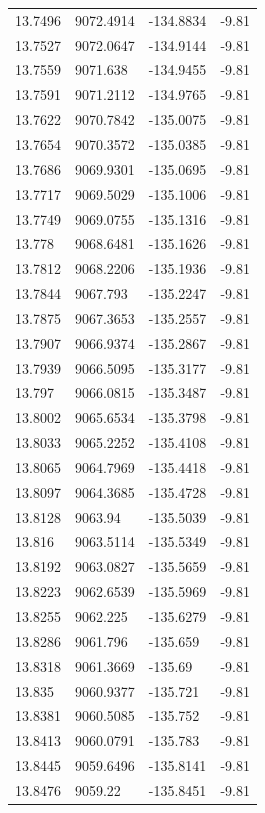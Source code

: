 \begin{table}[H]
\begin{tabular}{llll}
13.7496 & 9072.4914 & -134.8834 & -9.81 \\
13.7527 & 9072.0647 & -134.9144 & -9.81 \\
13.7559 & 9071.638 & -134.9455 & -9.81 \\
13.7591 & 9071.2112 & -134.9765 & -9.81 \\
13.7622 & 9070.7842 & -135.0075 & -9.81 \\
13.7654 & 9070.3572 & -135.0385 & -9.81 \\
13.7686 & 9069.9301 & -135.0695 & -9.81 \\
13.7717 & 9069.5029 & -135.1006 & -9.81 \\
13.7749 & 9069.0755 & -135.1316 & -9.81 \\
13.778 & 9068.6481 & -135.1626 & -9.81 \\
13.7812 & 9068.2206 & -135.1936 & -9.81 \\
13.7844 & 9067.793 & -135.2247 & -9.81 \\
13.7875 & 9067.3653 & -135.2557 & -9.81 \\
13.7907 & 9066.9374 & -135.2867 & -9.81 \\
13.7939 & 9066.5095 & -135.3177 & -9.81 \\
13.797 & 9066.0815 & -135.3487 & -9.81 \\
13.8002 & 9065.6534 & -135.3798 & -9.81 \\
13.8033 & 9065.2252 & -135.4108 & -9.81 \\
13.8065 & 9064.7969 & -135.4418 & -9.81 \\
13.8097 & 9064.3685 & -135.4728 & -9.81 \\
13.8128 & 9063.94 & -135.5039 & -9.81 \\
13.816 & 9063.5114 & -135.5349 & -9.81 \\
13.8192 & 9063.0827 & -135.5659 & -9.81 \\
13.8223 & 9062.6539 & -135.5969 & -9.81 \\
13.8255 & 9062.225 & -135.6279 & -9.81 \\
13.8286 & 9061.796 & -135.659 & -9.81 \\
13.8318 & 9061.3669 & -135.69 & -9.81 \\
13.835 & 9060.9377 & -135.721 & -9.81 \\
13.8381 & 9060.5085 & -135.752 & -9.81 \\
13.8413 & 9060.0791 & -135.783 & -9.81 \\
13.8445 & 9059.6496 & -135.8141 & -9.81 \\
13.8476 & 9059.22 & -135.8451 & -9.81 \\

\end{tabular}
\end{table}
